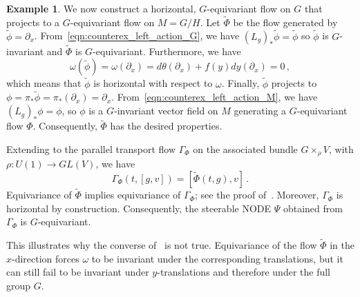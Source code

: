 \documentclass[12pt,a4paper]{article}
\numberwithin{equation}{section}
\theoremstyle{plain}
\theoremstyle{definition}
\newtheorem{example}[theorem]{Example}
\theoremstyle{remark}
\begin{document}
\begin{example}
    We now construct a horizontal, $G$-equivariant flow on $G$ that projects to a $G$-equivariant flow on $M=G/H$. Let $\tilde{\Phi}$ be the flow generated by $\tilde{\phi} = \partial_x$. From~\eqref{eqn:counterex_left_action_G}, we have $(L_g)_*\tilde{\phi} = \tilde{\phi}$ so $\tilde{\phi}$ is $G$-invariant and $\tilde{\Phi}$ is $G$-equivariant. Furthermore, we have
    \begin{equation}
        \omega(\tilde{\phi}) = \omega(\partial_x) = d\theta(\partial_x) + f(y)dy(\partial_x) = 0 \,,
    \end{equation}
    which means that $\tilde{\phi}$ is horizontal with respect to $\omega$. Finally, $\tilde{\phi}$ projects to $\phi=\pi_*\tilde{\phi} = \pi_*(\partial_x) = \partial_x$. From~\eqref{eqn:counterex_left_action_M}, we have $(L_g)_*\phi = \phi$, so $\phi$ is a $G$-invariant vector field on $M$ generating a $G$-equivariant flow $\Phi$. Consequently, $\tilde{\Phi}$ has the desired properties.

    Extending to the parallel transport flow $\Gamma_{\Phi}$ on the associated bundle $G \times_{\rho} V$, with $\rho:U(1) \to GL(V)$, we have
    \begin{equation}
        \Gamma_{\Phi}(t,[g,v]) = [\tilde{\Phi}(t,g),v]\,.
    \end{equation}
    Equivariance of $\tilde{\Phi}$ implies equivariance of $\Gamma_{\Phi}$; see the proof of~. Moreover, $\Gamma_{\Phi}$ is horizontal by construction. Consequently, the steerable NODE $\Psi$ obtained from $\Gamma_{\Phi}$ is $G$-equivariant.
    
    This illustrates why the converse of~ is not true. Equivariance of the flow $\tilde{\Phi}$ in the $x$-direction forces $\omega$ to be invariant under the corresponding translations, but it can still fail to be invariant under $y$-translations and therefore under the full group $G$.
\end{example}
\end{document}
